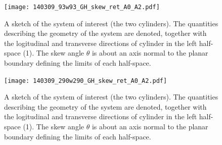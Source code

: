 \documentclass[onecolumn,letterpaper,amsmath,amssymb,floatfix,aps,superscriptaddress]{revtex4}
\begin{document}
\begin{figure}
\centerline{\texttt{[image: 140309\_93w93\_GH\_skew\_ret\_A0\_A2.pdf]}}
\caption{A sketch of the system of interest (the two cylinders). The quantities describing the geometry of the system are 
denoted, together with the logitudinal and transverse directions of cylinder in the left half-space (1). The skew angle $\theta$ is about an axis normal to the planar boundary defining the limits of each half-space.
}
\label{fig:sketch}
\end{figure}

\begin{figure}
\centerline{\texttt{[image: 140309\_290w290\_GH\_skew\_ret\_A0\_A2.pdf]}}
\caption{A sketch of the system of interest (the two cylinders). The quantities describing the geometry of the system are 
denoted, together with the logitudinal and transverse directions of cylinder in the left half-space (1). The skew angle $\theta$ is about an axis normal to the planar boundary defining the limits of each half-space.
}
\label{fig:sketch}
\end{figure}
\end{document}
